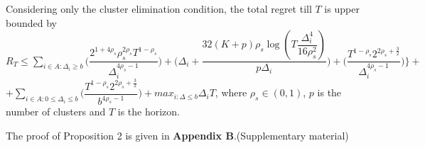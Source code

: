 \begin{remark}
\end{remark}
	
	
	

\begin{proposition}
Considering only the cluster elimination condition, the total regret till $T$ is upper bounded by $R_{T}\leq \sum_{i\in A:\Delta_{i}\geq b}\bigg(\dfrac{2^{1+4\rho_{s}}\rho_{s}^{2\rho_{s}}T^{1-\rho_{s}}}{\Delta_{i}^{4\rho_{s}-1}}\bigg) + \bigg(\Delta_{i}+\dfrac{32(K+p)\rho_{s}\log{(T\dfrac{\Delta_{i}^{4}}{16\rho_{s}^{2}})}}{p\Delta_{i}}\bigg)  +  \bigg(\dfrac{T^{1-\rho_{s}}2^{2\rho_{s}+\frac{3}{2}}}{\Delta_{i}^{4\rho_{s} -1}} \bigg) \bigg \rbrace+$\newline$+\sum_{i\in A:0\leq\Delta_{i}\leq b}\bigg(\dfrac{T^{1-\rho_{s}}2^{2\rho_{s}+\frac{3}{2}}}{b^{4\rho_{s} -1}} \bigg) + max_{i:\Delta\leq b}\Delta_{i}T$, where $\rho_{s}\in (0,1)$, $p$ is the number of clusters and $T$ is the horizon.
\end{proposition}

	The proof of Proposition 2 is given in \textbf{Appendix B}.(Supplementary material)



